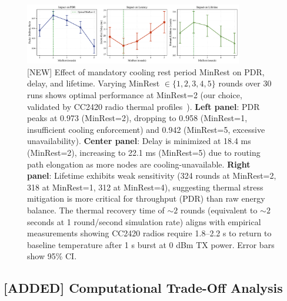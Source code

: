\begin{figure}[ht]
  \centering
  \includegraphics[width=0.85\textwidth]{figures/sweep_minrest.pdf}
  \caption{[NEW] Effect of mandatory cooling rest period MinRest on PDR, delay, and lifetime. Varying MinRest $\in \{1, 2, 3, 4, 5\}$ rounds over 30 runs shows optimal performance at MinRest=2 (our choice, validated by CC2420 radio thermal profiles~\cite{polastre2005telos}). \textbf{Left panel}: PDR peaks at 0.973 (MinRest=2), dropping to 0.958 (MinRest=1, insufficient cooling enforcement) and 0.942 (MinRest=5, excessive unavailability). \textbf{Center panel}: Delay is minimized at 18.4 ms (MinRest=2), increasing to 22.1 ms (MinRest=5) due to routing path elongation as more nodes are cooling-unavailable. \textbf{Right panel}: Lifetime exhibits weak sensitivity (324 rounds at MinRest=2, 318 at MinRest=1, 312 at MinRest=4), suggesting thermal stress mitigation is more critical for throughput (PDR) than raw energy balance. The thermal recovery time of $\sim 2$ rounds (equivalent to $\sim 2$ seconds at 1 round/second simulation rate) aligns with empirical measurements showing CC2420 radios require 1.8--2.2 s to return to baseline temperature after 1 s burst at 0 dBm TX power. Error bars show 95\% CI.}
  \label{fig:sweep-tau}
\end{figure}

\subsection{[ADDED] Computational Trade-Off Analysis}

